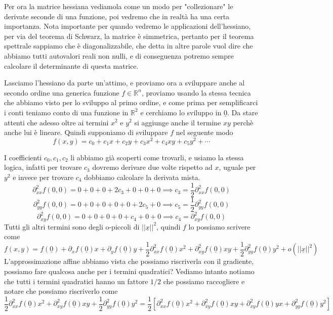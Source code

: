 \documentclass{rapport}
\begin{document}
Per ora la matrice hessiana vediamola come un modo per "collezionare" le derivate seconde di una funzione, poi vedremo che in realtà ha una certa importanza. Nota importante per quando vedremo le applicazioni dell'hessiano, per via del teorema di Schwarz, la matrice è simmetrica, pertanto per il teorema spettrale sappiamo che è diagonalizzabile, che detta in altre parole vuol dire che abbiamo tutti autovalori reali non nulli, e di conseguenza potremo sempre calcolare il determinante di questa matrice.

Lasciamo l'hessiano da parte un'attimo, e proviamo ora a sviluppare anche al secondo ordine una generica funzione $f\in\mathbb{R}^n$, proviamo usando la stessa tecnica che abbiamo visto per lo sviluppo al primo ordine, e come prima per semplificarci i conti teniamo conto di una funzione in $\mathbb{R}^2$ e cerchiamo lo sviluppo in $\underline{0}$. Da stare attenti che adesso oltre ai termini $x^2$ e $y^2$ si aggiunge anche il termine $xy$ perchè anche lui è lineare. Quindi supponiamo di sviluppare $f$ nel seguente modo 
\[
f(x,y) = c_0 + c_1x+ c_2y + c_3x^2+ c_4xy+c_5y^2 + \cdots
\]

I coefficienti $c_0, c_1, c_2$ li abbiamo già scoperti come trovarli,  e usiamo la stessa logica, infatti per trovare $c_3$ dovremo derivare due volte rispetto ad $x$, uguale per $y^2$ e invece per trovare $c_4$ dobbiamo calcolare la derivata mista. 
\[
\partial^2_{xx} f(0,0) = 0 + 0+ 0 +2c_3+0+ 0 + 0 \implies c_3 = \dfrac{1}{2}\partial^2_{xx} f(0,0)
\]
\[
\partial^2_{yy} f(0,0) = 0 + 0+ 0 +0+0+ 2c_5+0 \implies c_5 = \dfrac{1}{2}\partial^2_{yy} f(0,0)
\]
\[
\partial^2_{xy} f(0,0) = 0 + 0+ 0 +0+ c_4 + 0 +0\implies c_4 = \partial^2_{xy} f(0,0)
\]
Tutti gli altri termini sono degli o-piccoli di $||\underline{x}||^2$, quindi $f$ lo possiamo scrivere come 
\[
f(x,y) = f(\underline{0}) + \partial_x f(\underline{0}) x+ \partial_y f(\underline{0}) y + \dfrac{1}{2}\partial^2_{xx} f(\underline{0})x^2+ \partial^2_{xy} f(\underline{0})xy+ \dfrac{1}{2}\partial^2_{yy} f(\underline{0})y^2 + o(||\underline{x}||^2)
\]
L'approssimazione affine abbiamo vista che possiamo riscriverla con il gradiente, possiamo fare qualcosa anche per i termini quadratici? Vediamo intanto notiamo che tutti i termini quadratici hanno un fattore $1/2$ che possiamo raccogliere e notare che possiamo riscriverlo come 
\[
\dfrac{1}{2}\partial^2_{xx} f(\underline{0})x^2+ \partial^2_{xy} f(\underline{0})xy+ \dfrac{1}{2}\partial^2_{yy} f(\underline{0})y^2  =\dfrac{1}{2}\left[\partial^2_{xx} f(\underline{0})x^2+ \partial^2_{xy} f(\underline{0})xy+\partial^2_{xy} f(\underline{0})yx+ \partial^2_{yy} f(\underline{0})y^2 \right]
\]
\end{document}
